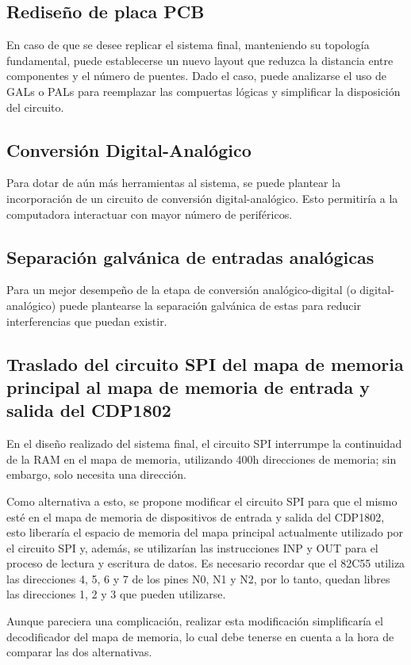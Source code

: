 \subsection{Rediseño de placa PCB}
En caso de que se desee replicar el sistema final, manteniendo su topología fundamental, puede establecerse un nuevo layout que reduzca la distancia entre componentes y el número de puentes. Dado el caso, puede analizarse el uso de GALs o PALs para reemplazar las compuertas lógicas y simplificar la disposición del circuito. 

\subsection{Conversión Digital-Analógico}
Para dotar de aún más herramientas al sistema, se puede plantear la incorporación de un circuito de conversión digital-analógico. Esto permitiría a la computadora interactuar con mayor número de periféricos.

\subsection{Separación galvánica de entradas analógicas}
Para un mejor desempeño de la etapa de conversión analógico-digital (o digital-analógico) puede plantearse la separación galvánica de estas para reducir interferencias que puedan existir.  

\subsection{Traslado del circuito SPI del mapa de memoria principal al mapa de memoria de entrada y salida del CDP1802}
En el diseño realizado del sistema final, el circuito SPI interrumpe la continuidad de la RAM en el mapa de memoria, utilizando 400h direcciones de memoria; sin embargo, solo necesita una dirección.

Como alternativa a esto, se propone modificar el circuito SPI para que el mismo esté en el mapa de memoria de dispositivos de entrada y salida del CDP1802, esto liberaría el espacio de memoria del mapa principal actualmente utilizado por el circuito SPI y, además, se utilizarían las instrucciones INP y OUT para el proceso de lectura y escritura de datos. Es necesario recordar que el 82C55 utiliza las direcciones 4, 5, 6 y 7 de los pines N0, N1 y N2, por lo tanto, quedan libres las direcciones 1, 2 y 3 que pueden utilizarse.

Aunque pareciera una complicación, realizar esta modificación simplificaría el decodificador del mapa de memoria, lo cual debe tenerse en cuenta a la hora de comparar las dos alternativas.

